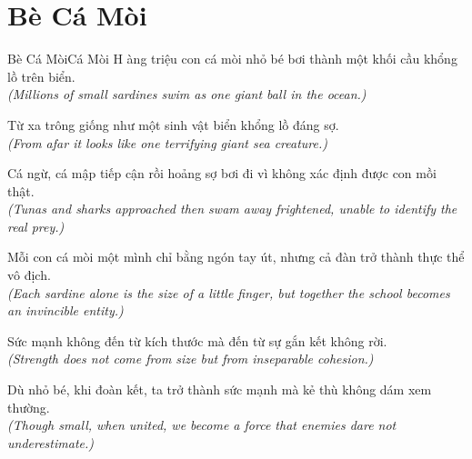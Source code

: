 \section{Bè Cá Mòi}
\begin{truyen}{Bè Cá Mòi}{Cá Mòi}
H àng triệu con cá mòi nhỏ bé bơi thành một khối cầu khổng lồ trên biển.\\
\textit{(Millions of small sardines swim as one giant ball in the ocean.)}

Từ xa trông giống như một sinh vật biển khổng lồ đáng sợ.\\
\textit{(From afar it looks like one terrifying giant sea creature.)}

Cá ngừ, cá mập tiếp cận rồi hoảng sợ bơi đi vì không xác định được con mồi thật.\\
\textit{(Tunas and sharks approached then swam away frightened, unable to identify the real prey.)}

Mỗi con cá mòi một mình chỉ bằng ngón tay út, nhưng cả đàn trở thành thực thể vô địch.\\
\textit{(Each sardine alone is the size of a little finger, but together the school becomes an invincible entity.)}

Sức mạnh không đến từ kích thước mà đến từ sự gắn kết không rời.\\
\textit{(Strength does not come from size but from inseparable cohesion.)}

\end{truyen}
\begin{baihoc}
  Dù nhỏ bé, khi đoàn kết, ta trở thành sức mạnh mà kẻ thù không dám xem thường.\\
  \textit{(Though small, when united, we become a force that enemies dare not underestimate.)}
\end{baihoc}

